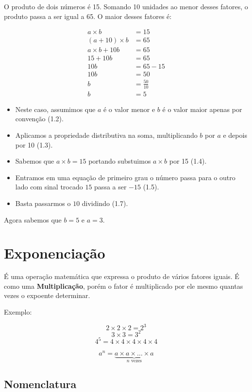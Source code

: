 \documentclass[letterpaper]{book}
\begin{document}
O produto de dois números é 15. Somando 10 unidades ao menor desses fatores, o produto passa a ser igual a 65. O maior desses fatores é:

\begin{align}
a \times b &= 15 \\
(a+10) \times b &= 65 \\
a \times b + 10b &= 65 \\
15 + 10b &= 65 \\
10b &= 65 - 15 \\
10b &= 50 \\
b &= \frac{50}{10} \\
b &= 5
\end{align}

\vspace{0.5em}

\begin{itemize}
\item Neste caso, assumimos que \(a\) é o valor menor e \(b\) é o valor maior apenas por convenção (1.2).
\item Aplicamos a propriedade distributiva na soma, multiplicando \(b\) por \(a\) e depois por 10 (1.3).
\item Sabemos que \(a \times b = 15\) portando substuimos \(a \times b\) por 15 (1.4).
\item Entramos em uma equação de primeiro grau o número passa para o outro lado com sinal trocado \(15\) passa a ser \(-15\) (1.5). 
\item Basta passarmos o \(10\) dividindo (1.7).
\end{itemize}

Agora sabemos que \(b = 5\) e \(a = 3\).

\section{Exponenciação}

É uma operação matemática que expressa o produto de vários fatores iguais. É como uma \textbf{Multiplicação}, porém o fator é multiplicado por ele mesmo quantas vezes o expoente determinar.

Exemplo:

\[
2 \times 2 \times 2 = 2^{3}
\]
\[
3 \times 3 = 3^{2}
\]
\[
4^5 = 4 \times 4 \times 4 \times 4 \times 4
\]

\[ a^{n} = \underbrace{a \times a \times \ldots \times a}_{n \text{ vezes}} \]

\subsection{Nomenclatura}
\end{document}
